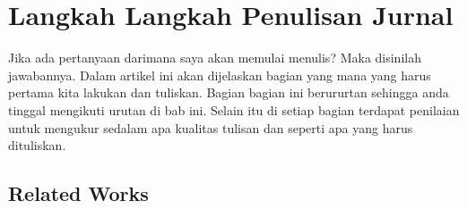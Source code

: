 \chapter{Langkah Langkah Penulisan Jurnal}

Jika ada pertanyaan darimana saya akan memulai menulis? Maka disinilah jawabannya. Dalam artikel ini akan dijelaskan bagian yang mana yang harus pertama kita lakukan dan tuliskan. Bagian bagian ini berururtan sehingga anda tinggal mengikuti urutan di bab ini. Selain itu di setiap bagian terdapat penilaian untuk mengukur sedalam apa kualitas tulisan dan seperti apa yang harus dituliskan.

\section{Related Works}

